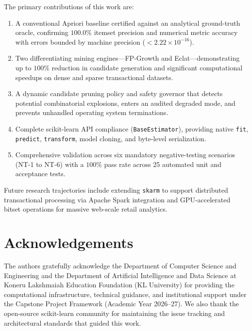 \documentclass[11pt,a4paper]{article}
\begin{document}
The primary contributions of this work are:
\begin{enumerate}
    \item A conventional Apriori baseline certified against an analytical ground-truth oracle, confirming $100.0\%$ itemset precision and numerical metric accuracy with errors bounded by machine precision ($< 2.22 \times 10^{-16}$).
    \item Two differentiating mining engines—FP-Growth and Eclat—demonstrating up to $100\%$ reduction in candidate generation and significant computational speedups on dense and sparse transactional datasets.
    \item A dynamic candidate pruning policy and safety governor that detects potential combinatorial explosions, enters an audited degraded mode, and prevents unhandled operating system terminations.
    \item Complete scikit-learn API compliance (\texttt{BaseEstimator}), providing native \texttt{fit}, \texttt{predict}, \texttt{transform}, model cloning, and byte-level serialization.
    \item Comprehensive validation across six mandatory negative-testing scenarios (NT-1 to NT-6) with a $100\%$ pass rate across 25 automated unit and acceptance tests.
\end{enumerate}

Future research trajectories include extending \texttt{skarm} to support distributed transactional processing via Apache Spark integration and GPU-accelerated bitset operations for massive web-scale retail analytics.

\vspace{0.7em}

\section*{Acknowledgements}
The authors gratefully acknowledge the Department of Computer Science and Engineering and the Department of Artificial Intelligence and Data Science at Koneru Lakshmaiah Education Foundation (KL University) for providing the computational infrastructure, technical guidance, and institutional support under the Capstone Project Framework (Academic Year 2026--27). We also thank the open-source scikit-learn community for maintaining the issue tracking and architectural standards that guided this work.
\end{document}
